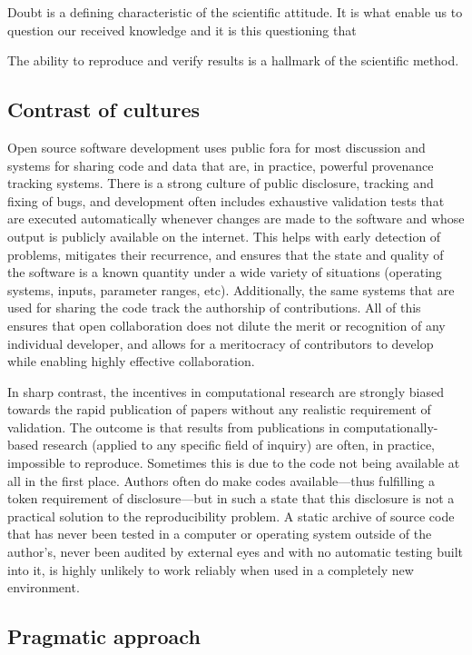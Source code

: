 \documentclass[ChapterTOCs,krantz2]{krantz} %
\begin{document}
Doubt is a defining characteristic of the scientific attitude.  It is
what enable us to question our received knowledge and it is this
questioning that 

The ability to reproduce and verify results is a hallmark of the
scientific method.

\subsection{Contrast of cultures}

Open source software development uses public fora for most discussion
and systems for sharing code and data that are, in practice, powerful
provenance tracking systems. There is a strong culture of public disclosure,
tracking and fixing of bugs, and development often includes exhaustive
validation tests that are executed automatically whenever changes
are made to the software and whose output is publicly available on
the internet. This helps with early detection of problems, mitigates
their recurrence, and ensures that the state and quality of the software
is a known quantity under a wide variety of situations (operating
systems, inputs, parameter ranges, etc). Additionally, the same systems
that are used for sharing the code track the authorship of contributions.
All of this ensures that open collaboration does not dilute the merit
or recognition of any individual developer, and allows for a meritocracy
of contributors to develop while enabling highly effective collaboration.

In sharp contrast, the incentives in computational research are strongly
biased towards the rapid publication of papers without any realistic
requirement of validation. The outcome is that results from publications
in computationally-based research (applied to any specific field of
inquiry) are often, in practice, impossible to reproduce. Sometimes
this is due to the code not being available at all in the first place.
Authors often do make codes available---thus fulfilling a token requirement
of disclosure---but in such a state that this disclosure is not a
practical solution to the reproducibility problem. A static archive
of source code that has never been tested in a computer or operating
system outside of the author's, never been audited by external eyes
and with no automatic testing built into it, is highly unlikely to
work reliably when used in a completely new environment.


\subsection{Pragmatic approach}
\end{document}
